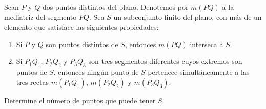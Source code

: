  Sean $P$ y $Q$ dos puntos distintos del plano. Denotemos por $m(PQ)$ a la mediatriz del segmento $PQ$. Sea $S$ un subconjunto finito del plano, con más de un elemento que satisface las siguientes propiedades:
  \begin{enumerate} 
     \item  Si $P$ y $Q$ son puntos distintos de $S$, entonces $m(PQ)$ interseca a $S$.
     \item Si $P_1Q_1$, $P_2Q_2$ y $P_3Q_3$ son tres segmentos diferentes cuyos extremos son puntos de $S$, entonces ningún punto de $S$ pertenece simultáneamente a las tres rectas $m(P_1Q_1)$, $m(P_2Q_2)$ y $m(P_3Q_3)$.
 \end{enumerate} 
Determine el número de puntos que puede tener $S$. 